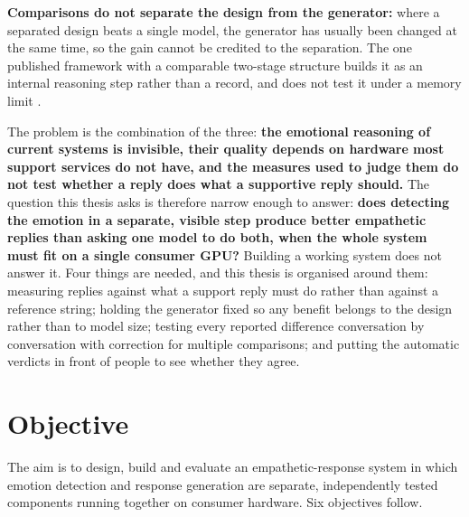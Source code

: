 \textbf{Comparisons do not separate the design from the generator:} where a separated design beats a single model, the generator has usually been changed at the same time, so the gain cannot be credited to the separation. The one published framework with a comparable two-stage structure builds it as an internal reasoning step rather than a record, and does not test it under a memory limit \cite{yang2024hef}.

The problem is the combination of the three: \textbf{the emotional reasoning of current systems is invisible, their quality depends on hardware most support services do not have, and the measures used to judge them do not test whether a reply does what a supportive reply should.} The question this thesis asks is therefore narrow enough to answer: \textbf{does detecting the emotion in a separate, visible step produce better empathetic replies than asking one model to do both, when the whole system must fit on a single consumer GPU?} Building a working system does not answer it. Four things are needed, and this thesis is organised around them: measuring replies against what a support reply must do rather than against a reference string; holding the generator fixed so any benefit belongs to the design rather than to model size; testing every reported difference conversation by conversation with correction for multiple comparisons; and putting the automatic verdicts in front of people to see whether they agree.

\section{Objective}
\label{sec:1.4}

The aim is to design, build and evaluate an empathetic-response system in which emotion detection and response generation are separate, independently tested components running together on consumer hardware. Six objectives follow.

